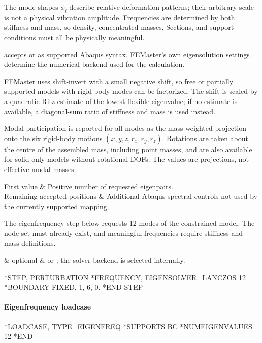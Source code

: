The mode shapes \(\phi_i\) describe relative deformation patterns; their arbitrary scale is not a physical vibration amplitude. Frequencies are determined by both stiffness and mass, so density, concentrated masses, Sections, and support conditions must all be physically meaningful.

 accepts  or  as supported Abaqus syntax. FEMaster's own eigensolution settings determine the numerical backend used for the calculation.

FEMaster uses shift-invert with a small negative shift, so free or partially supported models with rigid-body modes can be factorized. The shift is scaled by a quadratic Ritz estimate of the lowest flexible eigenvalue; if no estimate is available, a diagonal-sum ratio of stiffness and mass is used instead.

Modal participation is reported for all modes as the mass-weighted projection onto the six rigid-body motions \((x,y,z,r_x,r_y,r_z)\). Rotations are taken about the centre of the assembled mass, including point masses, and are also available for solid-only models without rotational DOFs. The values are projections, not effective modal masses.

\begin{keyworddata}
First value & Positive number of requested eigenpairs. \\
Remaining accepted positions & Additional Abaqus spectral controls not used by the currently supported mapping. \\
\end{keyworddata}

The eigenfrequency step below requests 12 modes of the constrained model. The node set  must already exist, and meaningful frequencies require stiffness and mass definitions.

\begin{keywordparameters}
 & optional &  or ; the solver backend is selected internally. \\
\end{keywordparameters}

\exampleheading

\begin{inputdeck}
*STEP, PERTURBATION
*FREQUENCY, EIGENSOLVER=LANCZOS
12
*BOUNDARY
FIXED, 1, 6, 0.
*END STEP
\end{inputdeck}

\paragraph*{Eigenfrequency loadcase}
\begin{inputdeck}
*LOADCASE, TYPE=EIGENFREQ
*SUPPORTS
BC
*NUMEIGENVALUES
12
*END
\end{inputdeck}

